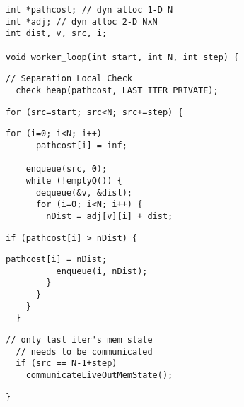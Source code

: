 \begin{lstlisting}[morekeywords={pathcost}, belowskip=0pt, firstnumber=1,
name=dij_checks]
int *pathcost; // dyn alloc 1-D N
int *adj; // dyn alloc 2-D NxN
int dist, v, src, i;

void worker_loop(int start, int N, int step) {
\end{lstlisting}

  \begin{lstlisting}[morekeywords={pathcost}, aboveskip=0pt,belowskip=0pt,backgroundcolor=\color{lightgray},
  firstnumber=auto, name=dij_checks]
  // Separation Local Check
  check_heap(pathcost, LAST_ITER_PRIVATE);
  \end{lstlisting}

\begin{lstlisting}[morekeywords={pathcost}, aboveskip=0pt,
belowskip=0pt, firstnumber=9,name=dij_checks]
  for (src=start; src<N; src+=step) {
\end{lstlisting}
\begin{lstlisting}[morekeywords={pathcost}, aboveskip=0pt,
belowskip=0pt, firstnumber=12,name=dij_checks]
    for (i=0; i<N; i++)
      pathcost[i] = inf;

    enqueue(src, 0);
    while (!emptyQ()) {
      dequeue(&v, &dist);
      for (i=0; i<N; i++) {
        nDist = adj[v][i] + dist;
\end{lstlisting}
\begin{lstlisting}[morekeywords={pathcost}, aboveskip=0pt,
belowskip=0pt, firstnumber=22,name=dij_checks]
        if (pathcost[i] > nDist) {
\end{lstlisting}
\begin{lstlisting}[morekeywords={pathcost}, aboveskip=0pt,
belowskip=0pt, firstnumber=25,name=dij_checks]
          pathcost[i] = nDist;
          enqueue(i, nDist);
        }
      }
    }
  }
\end{lstlisting}

\begin{lstlisting}[morekeywords={pathcost}, aboveskip=0pt,belowskip=0pt,backgroundcolor=\color{lightgray}, firstnumber=auto, name=dij_checks]
  // only last iter's mem state
  // needs to be communicated
  if (src == N-1+step)
    communicateLiveOutMemState();
\end{lstlisting}

\begin{lstlisting}[morekeywords={pathcost}, aboveskip=0pt,
belowskip=0pt, firstnumber=36,name=dij_checks]
}
\end{lstlisting}
